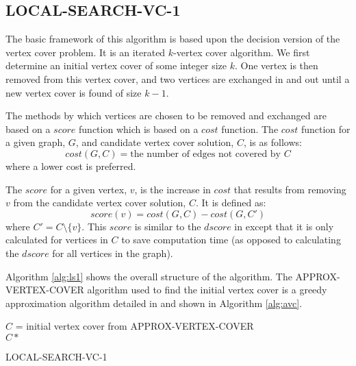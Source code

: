 \documentclass[sigconf]{acmart}
\begin{document}
\subsection{LOCAL-SEARCH-VC-1}
The basic framework of this algorithm is based upon the decision version of the vertex cover problem. It is an iterated $k$-vertex cover algorithm. We first determine an initial vertex cover of some integer size $k$. One vertex is then removed from this vertex cover, and two vertices are exchanged in and out until a new vertex cover is found of size $k - 1$.

The methods by which vertices are chosen to be removed and exchanged are based on a $score$ function which is based on a $cost$ function. The $cost$ function for a given graph, $G$, and candidate vertex cover solution, $C$, is as follows:
\begin{equation*}
	cost(G,C) = \text{the number of edges not covered by $C$}
\end{equation*}
where a lower cost is preferred.

The $score$ for a given vertex, $v$, is the increase in $cost$ that results from removing $v$ from the candidate vertex cover solution, $C$. It is defined as:
\begin{equation*}
	score(v) = cost(G,C) - cost(G,C')
\end{equation*}
where $C' = C \setminus \{v\}$. This $score$ is similar to the $dscore$ in \cite{cai2013numvc} except that it is only calculated for vertices in $C$ to save computation time (as opposed to calculating the $dscore$ for all vertices in the graph).

Algorithm \ref{alg:ls1} shows the overall structure of the algorithm. The APPROX-VERTEX-COVER algorithm used to find the initial vertex cover is a greedy approximation algorithm detailed in \cite{intro_alg_2009} and shown in Algorithm \ref{alg:avc}.

\begin{algorithm}[h]
	\SetAlgoNoLine
	$C$ = initial vertex cover from APPROX-VERTEX-COVER\\
	\Return $C*$
	\caption{LOCAL-SEARCH-VC-1}
	\label{alg:ls1}
\end{algorithm}
\end{document}
